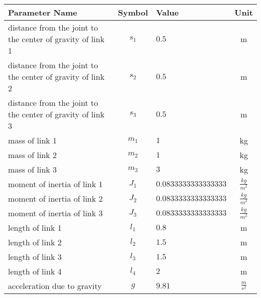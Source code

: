 \begin{tabular}{lclc}
\hline
 Parameter Name                                             &  Symbol  & Value                &       Unit       \\
\hline
 distance from the joint to the center of gravity of link 1 & $s_{1}$  & $0.5$                &        m         \\
 distance from the joint to the center of gravity of link 2 & $s_{2}$  & $0.5$                &        m         \\
 distance from the joint to the center of gravity of link 3 & $s_{3}$  & $0.5$                &        m         \\
 mass of link 1                                             & $m_{1}$  & $1$                  &        kg        \\
 mass of link 2                                             & $m_{2}$  & $1$                  &        kg        \\
 mass of link 3                                             & $m_{3}$  & $3$                  &        kg        \\
 moment of inertia of link 1                                & $J_{1}$  & $0.0833333333333333$ & $\frac{kg}{m^2}$ \\
 moment of inertia of link 2                                & $J_{2}$  & $0.0833333333333333$ & $\frac{kg}{m^2}$ \\
 moment of inertia of link 3                                & $J_{3}$  & $0.0833333333333333$ & $\frac{kg}{m^2}$ \\
 length of link 1                                           & $l_{1}$  & $0.8$                &        m         \\
 length of link 2                                           & $l_{2}$  & $1.5$                &        m         \\
 length of link 3                                           & $l_{3}$  & $1.5$                &        m         \\
 length of link 4                                           & $l_{4}$  & $2$                  &        m         \\
 acceleration due to gravity                                &   $g$    & $9.81$               & $\frac{m}{s^2}$  \\
\hline
\end{tabular}
